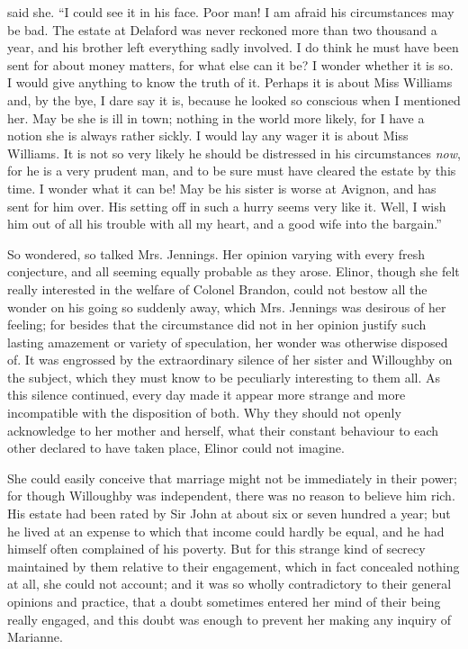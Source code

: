  said she. “I could see it in his face. Poor man! I am afraid his circumstances may be bad. The estate at Delaford was never reckoned more than two thousand a year, and his brother left everything sadly involved. I do think he must have been sent for about money matters, for what else can it be? I wonder whether it is so. I would give anything to know the truth of it. Perhaps it is about Miss Williams and, by the bye, I dare say it is, because he looked so conscious when I mentioned her. May be she is ill in town; nothing in the world more likely, for I have a notion she is always rather sickly. I would lay any wager it is about Miss Williams. It is not so very likely he should be distressed in his circumstances {\em now}, for he is a very prudent man, and to be sure must have cleared the estate by this time. I wonder what it can be! May be his sister is worse at Avignon, and has sent for him over. His setting off in such a hurry seems very like it. Well, I wish him out of all his trouble with all my heart, and a good wife into the bargain.”

So wondered, so talked Mrs. Jennings. Her opinion varying with every fresh conjecture, and all seeming equally probable as they arose. Elinor, though she felt really interested in the welfare of Colonel Brandon, could not bestow all the wonder on his going so suddenly away, which Mrs. Jennings was desirous of her feeling; for besides that the circumstance did not in her opinion justify such lasting amazement or variety of speculation, her wonder was otherwise disposed of. It was engrossed by the extraordinary silence of her sister and Willoughby on the subject, which they must know to be peculiarly interesting to them all. As this silence continued, every day made it appear more strange and more incompatible with the disposition of both. Why they should not openly acknowledge to her mother and herself, what their constant behaviour to each other declared to have taken place, Elinor could not imagine.

She could easily conceive that marriage might not be immediately in their power; for though Willoughby was independent, there was no reason to believe him rich. His estate had been rated by Sir John at about six or seven hundred a year; but he lived at an expense to which that income could hardly be equal, and he had himself often complained of his poverty. But for this strange kind of secrecy maintained by them relative to their engagement, which in fact concealed nothing at all, she could not account; and it was so wholly contradictory to their general opinions and practice, that a doubt sometimes entered her mind of their being really engaged, and this doubt was enough to prevent her making any inquiry of Marianne.

